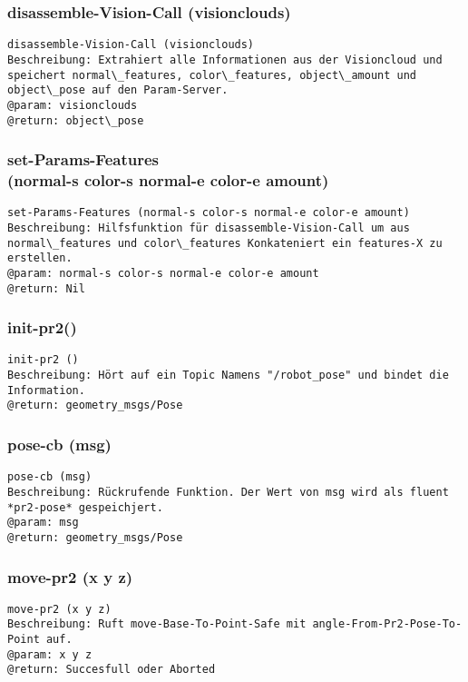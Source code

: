 \documentclass{suturo}
\begin{document}
\subsubsection{disassemble-Vision-Call (visionclouds)}
\begin{verbatim}
disassemble-Vision-Call (visionclouds)
Beschreibung: Extrahiert alle Informationen aus der Visioncloud und speichert normal\_features, color\_features, object\_amount und object\_pose auf den Param-Server.
@param: visionclouds
@return: object\_pose
\end{verbatim}



\subsubsection{set-Params-Features \\
(normal-s color-s normal-e color-e amount)}
\begin{verbatim}
set-Params-Features (normal-s color-s normal-e color-e amount)
Beschreibung: Hilfsfunktion für disassemble-Vision-Call um aus normal\_features und color\_features Konkateniert ein features-X zu erstellen. 
@param: normal-s color-s normal-e color-e amount
@return: Nil
\end{verbatim}


\subsubsection{init-pr2()}
\begin{verbatim}
init-pr2 ()
Beschreibung: Hört auf ein Topic Namens "/robot_pose" und bindet die Information.
@return: geometry_msgs/Pose
\end{verbatim}

\subsubsection{pose-cb (msg)}
\begin{verbatim}
pose-cb (msg)
Beschreibung: Rückrufende Funktion. Der Wert von msg wird als fluent *pr2-pose* gespeichjert.
@param: msg
@return: geometry_msgs/Pose
\end{verbatim}

\subsubsection{move-pr2 (x y z)}
\begin{verbatim}
move-pr2 (x y z)
Beschreibung: Ruft move-Base-To-Point-Safe mit angle-From-Pr2-Pose-To-Point auf.
@param: x y z 
@return: Succesfull oder Aborted
\end{verbatim}
\end{document}
